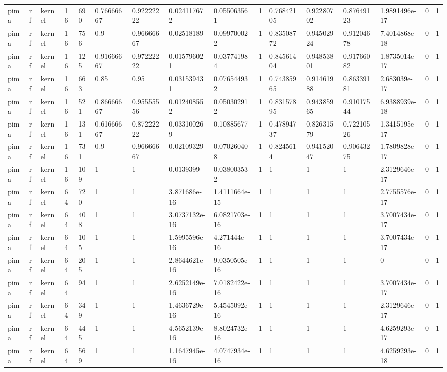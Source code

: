 \begin{tabular}{llllllllllllllll}
pima & rf & kernel & 16 & 690 & 0.76666667 & 0.92222222 & 0.024117672 & 0.055063561 & 1 & 0.76842105 & 0.92280702 & 0.87649123 & 1.9891496e-17 & 0 & 1 \\
pima & rf & kernel & 16 & 756 & 0.9 & 0.96666667 & 0.02518189 & 0.099700022 & 1 & 0.83508772 & 0.94502924 & 0.91204678 & 7.4014868e-18 & 0 & 1 \\
pima & rf & kernel & 16 & 125 & 0.91666667 & 0.97222222 & 0.015796021 & 0.037741984 & 1 & 0.84561404 & 0.94853801 & 0.91766082 & 1.8735014e-17 & 0 & 1 \\
pima & rf & kernel & 16 & 663 & 0.85 & 0.95 & 0.031539431 & 0.076544932 & 1 & 0.74385965 & 0.91461988 & 0.86339181 & 2.683039e-17 & 0 & 1 \\
pima & rf & kernel & 16 & 521 & 0.86666667 & 0.95555556 & 0.012408552 & 0.050302912 & 1 & 0.83157895 & 0.94385965 & 0.91017544 & 6.9388939e-18 & 0 & 1 \\
pima & rf & kernel & 16 & 131 & 0.61666667 & 0.87222222 & 0.033100269 & 0.10885677 & 1 & 0.47894737 & 0.82631579 & 0.72210526 & 1.3415195e-17 & 0 & 1 \\
pima & rf & kernel & 16 & 731 & 0.9 & 0.96666667 & 0.02109329 & 0.070260408 & 1 & 0.8245614 & 0.94152047 & 0.90643275 & 1.7809828e-17 & 0 & 1 \\
pima & rf & kernel & 16 & 109 & 1 & 1 & 0.0139399 & 0.038003532 & 1 & 1 & 1 & 1 & 2.3129646e-17 & 0 & 1 \\
pima & rf & kernel & 64 & 720 & 1 & 1 & 3.871686e-16 & 1.4111664e-15 & 1 & 1 & 1 & 1 & 2.7755576e-17 & 0 & 1 \\
pima & rf & kernel & 64 & 408 & 1 & 1 & 3.0737132e-16 & 6.0821703e-16 & 1 & 1 & 1 & 1 & 3.7007434e-17 & 0 & 1 \\
pima & rf & kernel & 64 & 105 & 1 & 1 & 1.5995596e-16 & 4.271444e-16 & 1 & 1 & 1 & 1 & 3.7007434e-17 & 0 & 1 \\
pima & rf & kernel & 64 & 205 & 1 & 1 & 2.8644621e-16 & 9.0350505e-16 & 1 & 1 & 1 & 1 & 0 & 0 & 1 \\
pima & rf & kernel & 64 & 94 & 1 & 1 & 2.6252149e-16 & 7.0182422e-16 & 1 & 1 & 1 & 1 & 3.7007434e-17 & 0 & 1 \\
pima & rf & kernel & 64 & 349 & 1 & 1 & 1.4636729e-16 & 5.4545092e-16 & 1 & 1 & 1 & 1 & 2.3129646e-17 & 0 & 1 \\
pima & rf & kernel & 64 & 445 & 1 & 1 & 4.5652139e-16 & 8.8024732e-16 & 1 & 1 & 1 & 1 & 4.6259293e-17 & 0 & 1 \\
pima & rf & kernel & 64 & 569 & 1 & 1 & 1.1647945e-16 & 4.0747934e-16 & 1 & 1 & 1 & 1 & 4.6259293e-18 & 0 & 1 \\

\end{tabular}
